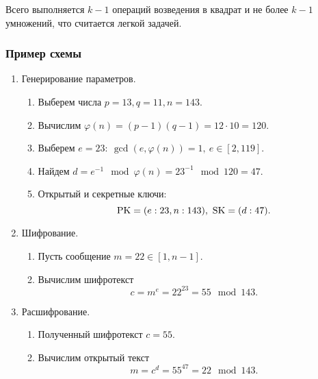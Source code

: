 Всего выполняется  $k-1$ операций возведения в квадрат и не более $k-1$ умножений, что считается легкой задачей.


\subsubsection{Пример схемы}

\begin{enumerate}
    \item Генерирование параметров.
        \begin{enumerate}
            \item Выберем числа $p=13, q=11, n = 143$.
            \item Вычислим $\varphi(n) = (p-1)(q-1) = 12 \cdot 10 = 120$.
            \item Выберем $e=23: ~ \gcd(e, \varphi(n))=1, ~ e \in [2, 119]$.
            \item Найдем $d = e^{-1} \mod \varphi(n) = 23^{-1} \mod 120 = 47$.
            \item Открытый и секретные ключи:
                \[ \textrm{PK} = (e:23, n:143), ~ \textrm{SK} = (d:47). \]
        \end{enumerate}
    \item Шифрование.
        \begin{enumerate}
            \item Пусть сообщение $m = 22 \in [1, n-1]$.
            \item Вычислим шифротекст
                \[ c = m^e = 22^{23} = 55 \mod 143. \]
        \end{enumerate}
    \item Расшифрование.
        \begin{enumerate}
            \item Полученный шифротекст $c = 55$.
            \item Вычислим открытый текст
                \[ m = c^d = 55^{47} = 22 \mod 143. \]
        \end{enumerate}
\end{enumerate}



